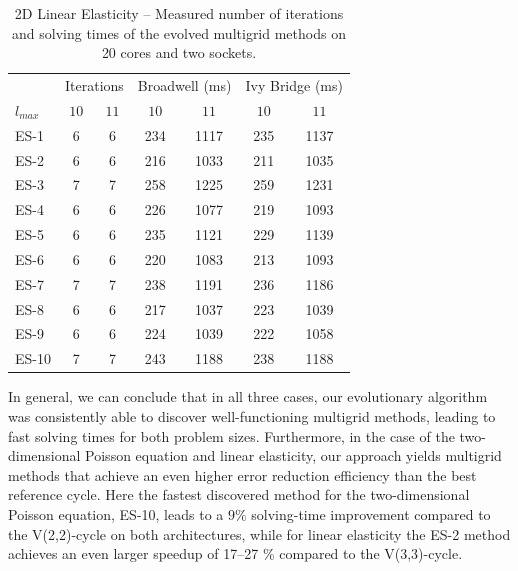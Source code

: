 \begin{table}
	\caption[2D Linear Elasticity -- Number of iterations and solving times of the evolved methods]{2D Linear Elasticity -- Measured number of iterations and solving times of the evolved multigrid methods on 20 cores and two sockets.}
	\label{table:linear-elasticity-2D-evolved-methods}
	\centering
	\begin{tabular}{l c c c c c c}
		\toprule
		& \multicolumn{2}{c}{Iterations} & \multicolumn{2}{c}{Broadwell (ms)} & \multicolumn{2}{c}{Ivy Bridge (ms)} \\
		\cmidrule(r){2-3} \cmidrule(r){4-5} \cmidrule(r){6-7}
		$l_{max}$ & $10$& $11$ & $10$ & $11$ & $10$ & $11$\\
		\midrule
		ES-1 & 6 & 6 & 234 & 1117 & 235 & 1137 \\
		\midrule
		ES-2 & 6 & 6 & 216 & 1033 & 211 & 1035 \\
		\midrule
		ES-3 & 7 & 7 & 258 & 1225 & 259 & 1231 \\
		\midrule
		ES-4 & 6 & 6 & 226 & 1077 & 219 & 1093 \\
		\midrule
		ES-5 & 6 & 6 & 235 & 1121 & 229 & 1139 \\
		\midrule
		ES-6 & 6 & 6 & 220 & 1083 & 213 & 1093 \\
		\midrule
		ES-7 & 7 & 7 & 238 & 1191 & 236 & 1186 \\
		\midrule
		ES-8 & 6 & 6 & 217 & 1037 & 223 & 1039 \\
		\midrule
		ES-9 & 6 & 6 & 224 & 1039 & 222 & 1058 \\
		\midrule
		ES-10 & 7 & 7 & 243 & 1188 & 238 & 1188 \\
		\bottomrule
	\end{tabular}
\end{table}
In general, we can conclude that in all three cases, our evolutionary algorithm was consistently able to discover well-functioning multigrid methods, leading to fast solving times for both problem sizes.
Furthermore, in the case of the two-dimensional Poisson equation and linear elasticity, our approach yields multigrid methods that achieve an even higher error reduction efficiency than the best reference cycle.
Here the fastest discovered method for the two-dimensional Poisson equation, ES-10, leads to a $9 \%$ solving-time improvement compared to the V(2,2)-cycle on both architectures, while for linear elasticity the ES-2 method achieves an even larger speedup of 17--27 \% compared to the V(3,3)-cycle.
